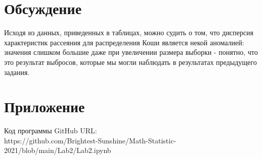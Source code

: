 \documentclass[a4paper]{article}
\begin{document}
\section {Обсуждение} 

\noindent Исходя из данных, приведенных в таблицах, можно судить о том, что дисперсия характеристик рассеяния для распределения Коши является некой аномалией: значения слишком большие даже при увеличении размера выборки - понятно, что это результат выбросов, которые мы могли наблюдать в результатах предыдущего задания.

\section {Приложение}
\noindent Код программы GitHub URL:\\
\newline https://github.com/Brightest-Sunshine/Math-Statistic-2021/blob/main/Lab2/Lab2.ipynb
\end{document}
